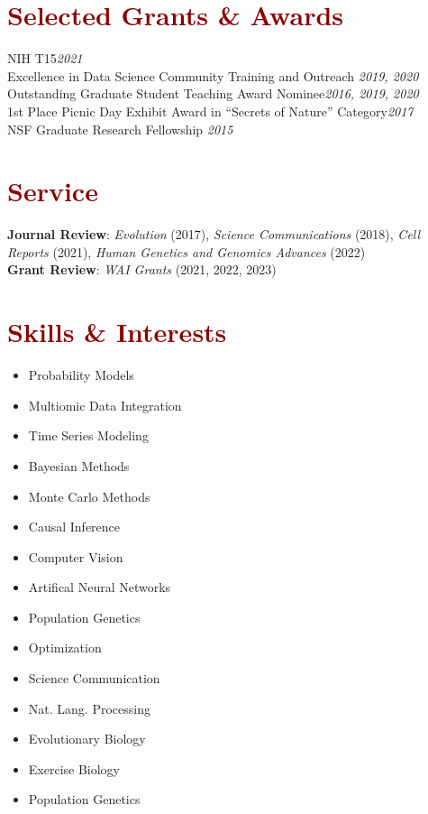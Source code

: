 \documentclass[11pt,margin,line]{resume}
\begin{document}
\begin{resume}
\section{\large\textcolor{DarkRed}{Selected Grants \& Awards}}
NIH T15\hfill \emph{2021}\\
Excellence in Data Science Community Training and Outreach \hfill \emph{2019, 2020}\\
Outstanding Graduate Student Teaching Award Nominee\hfill \emph{2016, 2019, 2020}\\
1st Place Picnic Day Exhibit Award in “Secrets of Nature” Category\hfill \emph{2017}\\
NSF Graduate Research Fellowship \hfill \emph{2015}\\

\vspace{-5mm}
\section{\large\textcolor{DarkRed}{Service}}
\textbf{Journal Review}: \emph{Evolution} (2017),  \emph{Science Communications} (2018),  \emph{Cell Reports} (2021), \emph{Human Genetics and Genomics Advances} (2022)\\
\textbf{Grant Review}: \emph{WAI Grants} (2021,  2022,  2023)

\section{\large\textcolor{DarkRed}{Skills \& Interests}}


\vspace{-0.0mm}
\begin{multicols}{3}
    \begin{itemize}
    \setlength\itemsep{-0.2em}
         \item Probability Models
         \item Multiomic Data Integration
	\item Time Series Modeling
	\item Bayesian Methods
         \item Monte Carlo Methods
         \item Causal Inference
         \item Computer Vision
         \item Artifical Neural Networks
         \item Population Genetics
         \item Optimization
         \item Science Communication
         \item Nat. Lang. Processing
         \item Evolutionary Biology
         \item Exercise Biology
         \item Population Genetics
         
    \end{itemize}
    \end{multicols}\vspace{-4.5mm}


\end{resume}
\end{document}
